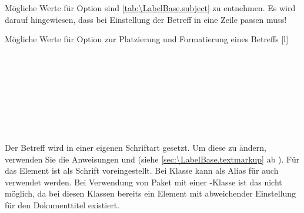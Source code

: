 Mögliche Werte für Option  sind
\autoref{tab:\LabelBase.subject} zu entnehmen. %
\iffalse%
Es wird ausdrücklich\textnote{Achtung!} darauf hingewiesen, dass bei der
Einstellung \OptionValue{subject}{underlined} der Betreff komplett in eine
Zeile passen muss!%
\else%
Es wird darauf hingewiesen, dass bei Einstellung
 der Betreff in eine Zeile passen muss!%
\fi%
\begin{table}
  \setcapindent{0pt}%
  \begin{captionbeside}
    {\hspace{0pt plus 1ex}%
      Mögliche Werte für Option  zur Platzierung und
      Formatierung eines Betreffs%
      \label{tab:\LabelBase.subject}}
    [l]
    \begin{minipage}[t]{.667\linewidth}
      \begin{desctabular}[t]
        \\[-1.7ex]
        \\[-1.7ex]
        \\[-1.7ex]
        \\[-1.7ex]
        \\[-1.7ex]
        \\[-1.7ex]
        \\[-1.7ex]
      \end{desctabular}
    \end{minipage}
  \end{captionbeside}
\end{table}

\BeginIndexGroup
{}%
%
Der Betreff wird in einer eigenen Schriftart gesetzt. Um
diese zu ändern, verwenden Sie die Anweisungen
 und
 (siehe
\autoref{sec:\LabelBase.textmarkup} ab
). Für das
Element
 ist als
Schrift  voreingestellt. Bei Klasse
 kann als Alias für
 auch
 verwendet werden. Bei
Verwendung von Paket  mit einer \KOMAScript-Klasse ist das
nicht möglich, da bei diesen Klassen bereits ein Element
 mit abweichender Einstellung für den Dokumenttitel
existiert.
\EndIndexGroup

